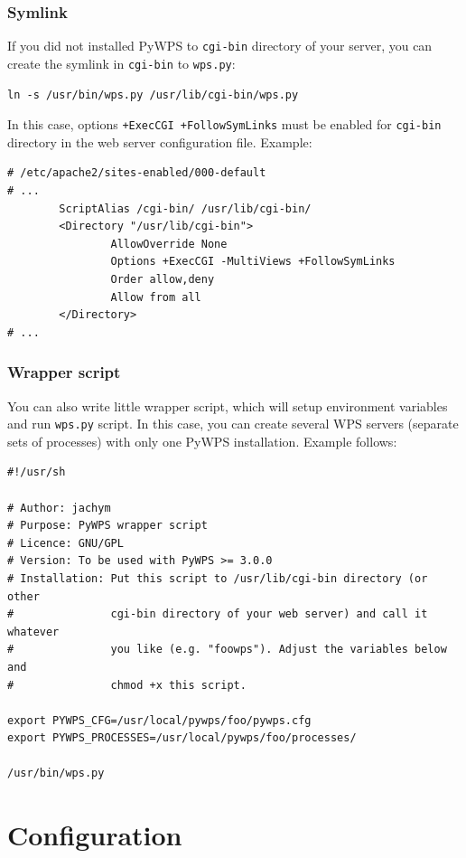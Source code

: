 \documentclass[a4paper,11pt]{report}
\begin{document}
\subsection{Symlink}
If you did not installed PyWPS to \texttt{cgi-bin} directory of your
server, you can create the symlink in \texttt{cgi-bin} to \texttt{wps.py}:
\begin{verbatim}
ln -s /usr/bin/wps.py /usr/lib/cgi-bin/wps.py
\end{verbatim}
In this case, options \texttt{+ExecCGI +FollowSymLinks} must be enabled for
\texttt{cgi-bin} directory in the web server configuration file. Example:
\begin{verbatim}
# /etc/apache2/sites-enabled/000-default
# ...
        ScriptAlias /cgi-bin/ /usr/lib/cgi-bin/
        <Directory "/usr/lib/cgi-bin">
                AllowOverride None
                Options +ExecCGI -MultiViews +FollowSymLinks
                Order allow,deny
                Allow from all
        </Directory>
# ...
\end{verbatim}

\subsection{Wrapper script}
\label{wrapper_script}
You can also write little wrapper script, which will setup environment
variables and run \texttt{wps.py} script. In this case, you can create
several WPS servers  (separate sets of processes) with only one PyWPS
installation. Example follows:
\begin{verbatim}
#!/usr/sh

# Author: jachym
# Purpose: PyWPS wrapper script
# Licence: GNU/GPL
# Version: To be used with PyWPS >= 3.0.0
# Installation: Put this script to /usr/lib/cgi-bin directory (or other
#               cgi-bin directory of your web server) and call it whatever
#               you like (e.g. "foowps"). Adjust the variables below and 
#               chmod +x this script.

export PYWPS_CFG=/usr/local/pywps/foo/pywps.cfg
export PYWPS_PROCESSES=/usr/local/pywps/foo/processes/

/usr/bin/wps.py
\end{verbatim}

\chapter{Configuration}
\label{configuration}
    
\end{document}
